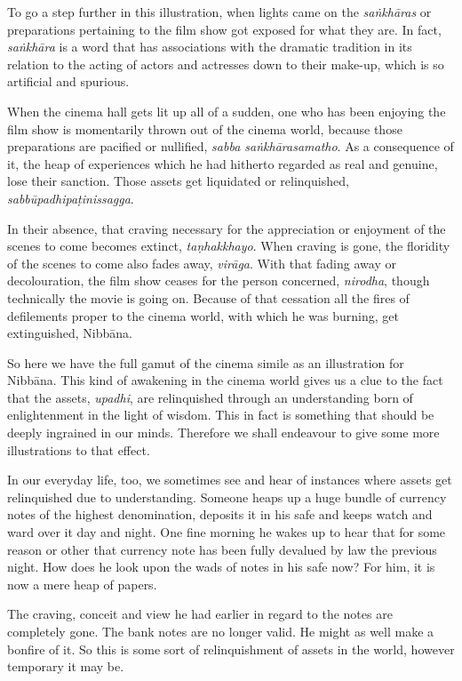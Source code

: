 To go a step further in this illustration, when lights came on the \emph{saṅkhāras} or preparations pertaining to the film show got exposed for what they are. In fact, \emph{saṅkhāra} is a word that has associations with the dramatic tradition in its relation to the acting of actors and actresses down to their make-up, which is so artificial and spurious.

When the cinema hall gets lit up all of a sudden, one who has been enjoying the film show is momentarily thrown out of the cinema world, because those preparations are pacified or nullified, \emph{sabba saṅkhārasamatho}. As a consequence of it, the heap of experiences which he had hitherto regarded as real and genuine, lose their sanction. Those assets get liquidated or relinquished, \emph{sabbūpadhipaṭinissagga}.

In their absence, that craving necessary for the appreciation or enjoyment of the scenes to come becomes extinct, \emph{taṇhakkhayo}. When craving is gone, the floridity of the scenes to come also fades away, \emph{virāga}. With that fading away or decolouration, the film show ceases for the person concerned, \emph{nirodha}, though technically the movie is going on. Because of that cessation all the fires of defilements proper to the cinema world, with which he was burning, get extinguished, Nibbāna.

So here we have the full gamut of the cinema simile as an illustration for Nibbāna. This kind of awakening in the cinema world gives us a clue to the fact that the assets, \emph{upadhi}, are relinquished through an understanding born of enlightenment in the light of wisdom. This in fact is something that should be deeply ingrained in our minds. Therefore we shall endeavour to give some more illustrations to that effect.

In our everyday life, too, we sometimes see and hear of instances where assets get relinquished due to understanding. Someone heaps up a huge bundle of currency notes of the highest denomination, deposits it in his safe and keeps watch and ward over it day and night. One fine morning he wakes up to hear that for some reason or other that currency note has been fully devalued by law the previous night. How does he look upon the wads of notes in his safe now? For him, it is now a mere heap of papers.

The craving, conceit and view he had earlier in regard to the notes are completely gone. The bank notes are no longer valid. He might as well make a bonfire of it. So this is some sort of relinquishment of assets in the world, however temporary it may be.

